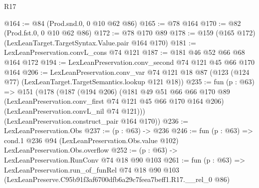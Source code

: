 \begin{lexlean}{R17}
\begin{coremodule}
@164 := @84 (Prod.snd.{0, 0} @10 @62 @86)
@165 := @78 @164
@170 := @82 (Prod.fst.{0, 0} @10 @62 @86)
@172 := @78 @170 @89
@178 := @159 (@165 @172) (LexLeanTarget.TargetSyntax.Value.pair @164 @170)
@181 := LexLeanPreservation.convL_cons @74 @121
@187 := @181 @46 @52 @66 @68 @164 @172
@194 := LexLeanPreservation.conv_second @74 @121 @45 @66 @170 @164
@206 := LexLeanPreservation.conv_var
    @74
    @121
    @18
    @87
    (@123 (@124 @77) (LexLeanTarget.TargetSemantics.lookup @121 @18))
@235 := fun (p : @63) =>
  @151
    (@178
      (@187
        (@194 @206)
        (@181
          @49
          @51
          @66
          @66
          @170
          @89
          (LexLeanPreservation.conv_first @74 @121 @45 @66 @170 @164 @206)
          (LexLeanPreservation.convL_nil @74 @121)))
      (LexLeanPreservation.construct_pair @164 @170))
@236 := LexLeanPreservation.Obs
@237 := (p : @63) -> @236
@246 := fun (p : @63) =>
  cond.{1} @236 @94 (LexLeanPreservation.Obs.value @102) LexLeanPreservation.Obs.overflow
@252 := (p : @63) -> LexLeanPreservation.RunConv @74 @18 @90 @103
@261 := fun (p : @63) =>
  LexLeanPreservation.run_of_funRel
    @74
    @18
    @90
    @103
    (LexLeanPreserve.C95b91f3af6700dfb6a29c7feea7beff1.R17.__rel_0 @86)
\end{coremodule}
\end{lexlean}
